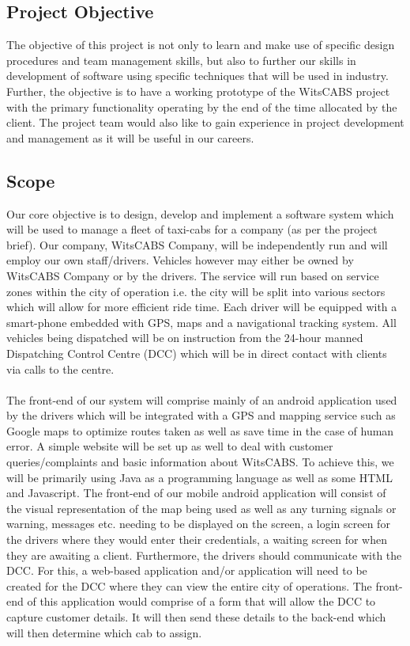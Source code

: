 \documentclass[a4paper,12pt]{article}
\begin{document}
\subsection{Project Objective}
The objective of this project is not only to learn and make use of specific design procedures and team management skills, but also to further our skills in development of software using specific techniques that will be used in industry. Further, the objective is to have a working prototype of the WitsCABS project with the primary functionality operating by the end of the time allocated by the client. The project team would also like to gain experience in project development and management as it will be useful in our careers.
\newpage
\subsection{Scope}
Our core objective is to design, develop and implement a software system which will be used to manage a fleet of taxi-cabs for a company (as per the project brief). Our company, WitsCABS Company, will be independently run and will employ our own staff/drivers. Vehicles however may either be owned by WitsCABS Company or by the drivers. The service will run based on service zones within the city of operation i.e. the city will be split into various sectors which will allow for more efficient ride time. Each driver will be equipped with a smart-phone embedded with GPS, maps and a navigational tracking system. All vehicles being dispatched will be on instruction from the 24-hour manned Dispatching Control Centre (DCC) which will be in direct contact with clients via calls to the centre.
\\\\
The front-end of our system will comprise mainly of an android application used by the drivers which will be integrated with a GPS and mapping service such as Google maps to optimize routes taken as well as save time in the case of human error. A simple website will be set up as well to deal with customer queries/complaints and basic information about WitsCABS. To achieve this, we will be primarily using Java as a programming language as well as some HTML and Javascript. The front-end of our mobile android application will consist of the visual representation of the map being used as well as any turning signals or warning, messages etc. needing to be displayed on the screen, a login screen for the drivers where they would enter their credentials, a waiting screen for when they are awaiting a client. Furthermore, the drivers should communicate with the DCC. For this, a web-based application and/or application will need to be created for the DCC where they can view the entire city of operations. The front-end of this application would comprise of a form that will allow the DCC to capture customer details. It will then send these details to the back-end which will then determine which cab to assign.\\ \\
\end{document}
